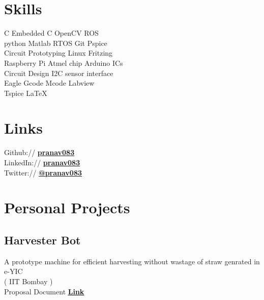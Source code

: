 \documentclass[]{font}
\begin{document}
\begin{minipage}[t]{0.35\textwidth}
\section{Skills}
C \textbullet{}  Embedded C \textbullet{} OpenCV \textbullet{} ROS \\
python \textbullet{} Matlab \textbullet{} RTOS   \textbullet{} Git \textbullet{} Pspice\\
Circuit Prototyping \textbullet{} Linux \textbullet{} Fritzing \\ 
Raspberry Pi \textbullet{} Atmel chip \textbullet{} Arduino \textbullet{} ICs \\
Circuit Design \textbullet{} I2C \textbullet{} sensor interface \\
Eagle \textbullet{} Gcode \textbullet{} Mcode \textbullet{} Labview \\
Tspice \textbullet{} \LaTeX\ \\
\sectionsep



\section{Links} 
Github:// \href{https://github.com/pranav083}{\bf pranav083} \\
LinkedIn://  \href{https://www.linkedin.com/in/pranav083}{\bf pranav083} \\
Twitter://  \href{https://twitter.com/pranav083}{\bf @pranav083} \\


\section{Personal Projects}
\subsection{Harvester Bot}
\textbullet{} A prototype machine for efficient harvesting without wastage of straw genrated in e-YIC \\
( IIT Bombay ) \\
\textbullet{} Proposal Document \underline{\textbf{\href{https://drive.google.com/file/d/0B0cF1Lq6c1cPcURJdkJjQmVFcFk3eTgtTGg5VktPVHJWWU5R/view?usp=sharing}{Link}}} \\


\end{minipage}
\end{document}
